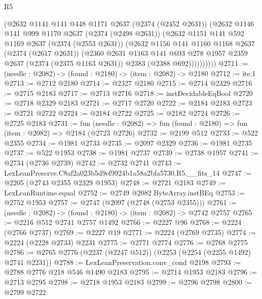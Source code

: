 \begin{lexlean}{R5}
\begin{coremodule}
            (@2632
              @1141
              @141
              @448
              @1171
              @2637
              (@2374 (@2452 @2631))
              (@2632
                @1146
                @141
                @999
                @1170
                @2637
                (@2374 (@2498 @2631))
                (@2632
                  @1151
                  @141
                  @592
                  @1169
                  @2637
                  (@2374 (@2553 @2631))
                  (@2632
                    @1156
                    @141
                    @1160
                    @1168
                    @2637
                    (@2374 (@2617 @2631))
                    (@2360
                      @2631
                      @1163
                      @141
                      @693
                      @278
                      @1957
                      @2359
                      @2637
                      (@2374 (@2375 @1163 @2631))
                      @2383
                      (@2388 @692))))))))))
@2711 := (needle : @2082) -> (found : @2180) -> (item : @2082) -> @2180
@2712 := ite.{1}
@2713 := @2712 @2180
@2714 := @2327 @2180
@2715 := @2714 @2329
@2716 := @2715 @2183
@2717 := @2713 @2716
@2718 := instDecidableEqBool
@2720 := @2718 @2329 @2183
@2721 := @2717 @2720
@2722 := @2184 @2183
@2723 := @2721 @2722
@2724 := @2184 @2722
@2725 := @2182 @2724
@2726 := @2725 @2183
@2731 := fun (needle : @2082) => fun (found : @2180) => fun (item : @2082) => @2184 (@2723 @2726)
@2732 := @2199 @512
@2733 := @522 @2355
@2734 := @1981 @2733
@2735 := @2097 @2329
@2736 := @1981 @2735
@2737 := @522 @1953
@2738 := @1981 @2737
@2739 := @2738 @1957
@2741 := @2734 (@2736 @2739)
@2742 := @2732 @2741
@2743 := LexLeanPreserve.C8af2a023b5d9ef9924b1a58a2bfa5730.R5.__fits_14
@2747 := @2205 (@2743 @2355 @2329 @1953)
@2748 := @2721 @2183
@2749 := LexLeanRuntime.equal
@2752 := @2749 @2082 ByteArray.instBEq
@2753 := @2752 @1953
@2757 := @2747 (@2097 (@2748 (@2753 @2355)))
@2761 := (needle : @2082) -> (found : @2180) -> (item : @2082) -> @2742 @2757
@2765 := @2216 @512 @2741 @2757 @1492
@2766 := @2227 @96
@2768 := @2224 (@2766 @2737)
@2769 := @2227 @19
@2771 := @2224 (@2769 @2735)
@2774 := @2224 (@2228 @2733) @2231
@2775 := @2771 @2774
@2776 := @2768 @2775
@2786 := @2765 @2776 (@2237 (@2247 @512)) (@2253 (@2254 (@2255 @1492) @2741 @2231))
@2788 := LexLeanPreservation.conv_cond @2198
@2793 := @2788 @2776 @218 @546 @1490 @2183
@2795 := @2714 @1953 @2183
@2796 := @2713 @2795
@2798 := @2718 @1953 @2183
@2799 := @2796 @2798
@2800 := @2799 @2722

\end{coremodule}
\end{lexlean}
